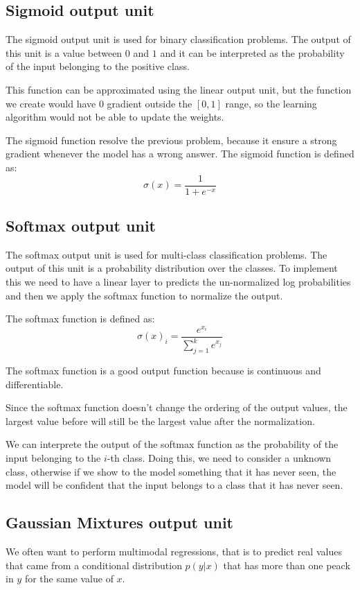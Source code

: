 \subsection{Sigmoid output unit}
The sigmoid output unit is used for binary classification problems. The output
of this unit is a value between $0$ and $1$ and it can be interpreted as the
probability of the input belonging to the positive class.

This function can be approximated using the linear output unit, but the function
we create would have 0 gradient outside the $[0, 1]$ range, so the learning
algorithm would not be able to update the weights.

The sigmoid function resolve the previous problem, because it ensure a strong
gradient whenever the model has a wrong answer. The sigmoid function is defined as:
\begin{equation}
    \sigma(x) = \frac{1}{1+e^{-x}}
\end{equation}
\subsection{Softmax output unit}
The softmax output unit is used for multi-class classification problems. The output
of this unit is a probability distribution over the classes. To implement this
we need to have a linear layer to predicts the un-normalized log probabilities and
then we apply the softmax function to normalize the output.

The softmax function is defined as:
\begin{equation}
    \sigma(x)_i = \frac{e^{x_i}}{\sum_{j=1}^k e^{x_j}}
\end{equation}

The softmax function is a good output function because is continuous and
differentiable.

Since the softmax function doesn't change the ordering of the output values, the
largest value before will still be the largest value after the normalization.

We can interprete the output of the softmax function as the probability of the
input belonging to the $i$-th class. Doing this, we need to consider a unknown
class, otherwise if we show to the model something that it has never seen, the
model will be confident that the input belongs to a class that it has never seen.
\subsection{Gaussian Mixtures output unit}
We often want to perform multimodal regressions, that is to predict real values
that came from a conditional distribution $p(y|x)$ that has more than one peack
in $y$ for the same value of $x$.

